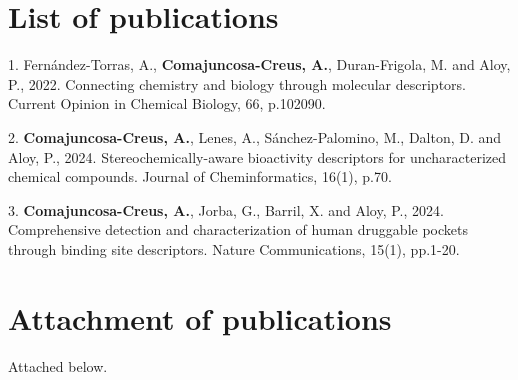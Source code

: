 \section{List of publications}
\label{ListOfPublications}

1. Fernández-Torras, A., \textbf{Comajuncosa-Creus, A.}, Duran-Frigola, M. and Aloy, P., 2022. Connecting chemistry and biology through molecular descriptors. Current Opinion in Chemical Biology, 66, p.102090.

2. \textbf{Comajuncosa-Creus, A.}, Lenes, A., Sánchez-Palomino, M., Dalton, D. and Aloy, P., 2024. Stereochemically-aware bioactivity descriptors for uncharacterized chemical compounds. Journal of Cheminformatics, 16(1), p.70.

3. \textbf{Comajuncosa-Creus, A.}, Jorba, G., Barril, X. and Aloy, P., 2024. Comprehensive detection and characterization of human druggable pockets through binding site descriptors. Nature Communications, 15(1), pp.1-20.

\newpage
\section{Attachment of publications}

Attached below.

